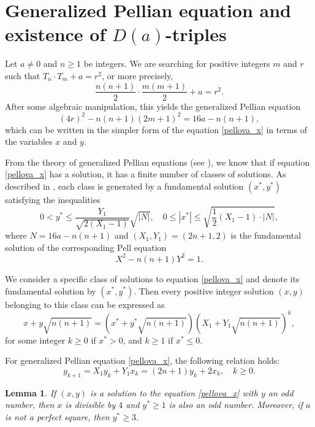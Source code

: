 \documentclass[12pt]{amsart}
\newtheorem{lemma}[theorem]{Lemma}
\theoremstyle{definition}
\begin{document}
\section{Generalized Pellian equation and existence of $D(a)$-triples}\label{section:triple}

Let $a\neq 0$ and $n\geq 1$ be integers. We are searching for positive integers $m$ and $r$ such that $T_n \cdot T_m +a= r^2$, or more precisely,
$$\frac{n(n+1)}{2} \cdot \frac{m(m+1)}{2}+a = r^2.$$
After some algebraic manipulation, this yields the generalized Pellian equation
\begin{equation}\label{pellova_m}
    (4r)^2 - n(n+1)(2m+1)^2 = 16a-n(n+1),
\end{equation}
which can be written in the simpler form of the equation \eqref{pellova_x} in terms of the variables $x$ and $y$. 

From the theory of generalized Pellian equations (see \cite[Theorem 109]{nagell}), we know that if equation \eqref{pellova_x} has a solution, it has a finite number of classes of solutions. As described in \cite[Theorem 108a]{nagell}, each class is generated by a fundamental solution $(x^*,y^*)$ satisfying the inequalities
\begin{equation}\label{ineq_granice_fund}
0<y^*\leq \frac{Y_1}{\sqrt{2(X_1-1)}}\sqrt{|N|},\quad 0\leq|x^*|\leq\sqrt{\frac{1}{2}(X_1-1)\cdot |N|},
\end{equation}
where $N=16a-n(n+1)$ and $(X_1,Y_1)=(2n+1,2)$ is the fundamental solution of the corresponding Pell equation 
\begin{equation}\label{eq_pellova_1}
X^2-n(n+1)Y^2=1.
\end{equation}

We consider a specific class of solutions to equation \eqref{pellova_x} and denote its fundamental solution by $(x^*,y^*)$. Then every positive integer solution $(x,y)$ belonging to this class can be expressed as
$$x+y\sqrt{n(n+1)}=(x^*+y^*\sqrt{n(n+1)})\left(X_1+Y_1\sqrt{n(n+1)}\right)^k,$$
for some integer $k \geq 0$ if $x^* > 0$, and $k \geq 1$ if $x^* \leq 0$. 

For generalized Pellian equation  \eqref{pellova_x}, the following relation holds: 
\begin{equation}\label{niz_y_x}
    y_{k+1}=X_1y_k+Y_1x_k=(2n+1)y_k+2x_k,\quad k\geq 0.
\end{equation}


\begin{lemma}\label{lema_svojstva_xy}
    If $(x,y)$ is a solution to the equation \eqref{pellova_x} with $y$ an odd number, then  $x$ is divisible by $4$ and $y^*\geq 1$ is also an odd number. Moreover, if $a$ is not a perfect square, then $y^*\geq 3$. 
\end{lemma}
\end{document}
